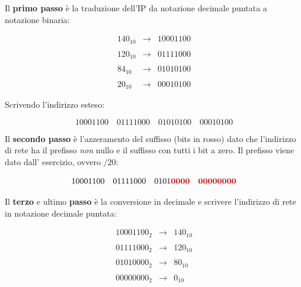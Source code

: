 \documentclass[a4paper]{article}
\newcommand{\binaryaddress}[4]{#1 \hspace{1em} #2 \hspace{1em} #3 \hspace{1em} #4}
\begin{document}
	\noindent
	Il \textbf{primo passo} è la traduzione dell’IP da notazione decimale puntata a notazione binaria:
	
	\begin{equation*}
		\begin{array}{lll}
			140_{10}	& \longrightarrow & 10001100 \\
			&& \\
			120_{10}	& \longrightarrow & 01111000 \\
			&& \\
			84_{10}		& \longrightarrow & 01010100 \\
			&& \\
			20_{10}		& \longrightarrow & 00010100
		\end{array}
	\end{equation*}
	
	\noindent
	Scrivendo l’indirizzo esteso:
	
	\begin{equation*}
		\binaryaddress{10001100}{01111000}{01010100}{00010100}
	\end{equation*}

	\noindent
	Il \textbf{secondo passo} è l’azzeramento del suffisso (bits in rosso) dato che l’indirizzo di rete ha il prefisso \emph{non} nullo e il suffisso con tutti i bit a zero. Il prefisso viene dato dall’ esercizio, ovvero $/20$:
	
	\begin{equation*}
		\binaryaddress{10001100}{01111000}{0101\textcolor{Red3}{\boldsymbol{0000}}}{\textcolor{Red3}{\boldsymbol{00000000}}}
	\end{equation*}

	\noindent
	Il \textbf{terzo} e ultimo \textbf{passo} è la conversione in decimale e scrivere l’indirizzo di rete in notazione decimale puntata:
	
	\begin{equation*}
		\begin{array}{lll}
			10001100_{2}	& \longrightarrow & 140_{10} \\
			&& \\
			01111000_{2}	& \longrightarrow & 120_{10} \\
			&& \\
			01010000_{2}	& \longrightarrow & 80_{10} \\
			&& \\
			00000000_{2}	& \longrightarrow & 0_{10}
		\end{array}
	\end{equation*}
\end{document}
